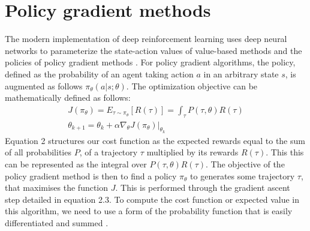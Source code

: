 \documentclass[a4paper,twoside,12pt]{report}
\begin{document}
\section{Policy gradient methods}
\label{policygrad} 
The modern implementation of deep reinforcement learning uses deep neural networks to parameterize the state-action values of value-based methods and the policies of policy gradient methods \citep{policygrad}. For policy gradient algorithms, the policy, defined as the probability of an agent taking action $a$ in an arbitrary state $s$, is augmented as follows $\pi_\theta(a|s;\theta)$. The optimization objective can be mathematically defined as follows:
\begin{align}
    J(\pi_\theta) = E_{\tau \sim \pi_\theta} [R(\tau)] = \int_{\tau} P(\tau,\theta)R(\tau) \\
    \theta_{k+1} = \theta_{k} + \alpha \nabla_{\theta}J(\pi_{\theta})|_{\theta_{k}}
\end{align}
Equation 2 structures our cost function as the expected rewards equal to the sum of all probabilities $P$, of a trajectory $\tau$ multiplied by its rewards $R(\tau)$. This this can be represented as the integral over $P(\tau,\theta)R(\tau)$. The objective of the policy gradient method is then to find a policy $\pi_\theta$ to generates some trajectory $\tau$, that maximises the function $J$. This is performed through the gradient ascent step detailed in equation 2.3. To compute the cost function or expected value in this algorithm, we need to use a form of the probability function that is easily differentiated and summed \citep{policygrad}. \medskip
\end{document}
